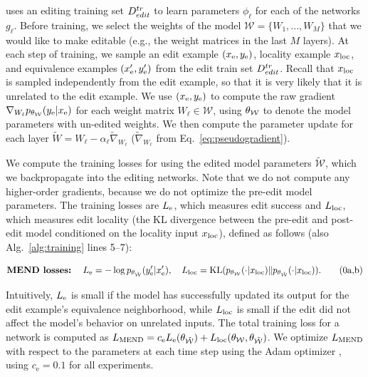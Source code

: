 \documentclass{article}
\begin{document}
{\name} uses an editing training set $D^{tr}_{edit}$ to learn parameters $\phi_\ell$ for each of the {\name} networks $g_\ell$. Before training, we select the weights of the model $\mathcal{W}=\{W_1,...,W_M\}$ that we would like to make editable (e.g., the weight matrices in the last $M$ layers). At each step of training, we sample an edit example $(x_\text{e},y_\text{e})$, locality example $x_\text{loc}$, and equivalence examples $(x_\text{e}',y_\text{e}')$ from the edit train set $D^{tr}_{edit}$. Recall that $x_\text{loc}$ is sampled independently from the edit example, so that it is very likely that it is unrelated to the edit example. We use $(x_\text{e},y_\text{e})$ to compute the raw gradient $\nabla_{W_\ell}p_{\theta_\mathcal{W}}(y_\text{e}|x_\text{e})$ for each weight matrix $W_\ell\in\mathcal{W}$, using $\theta_\mathcal{W}$ to denote the model parameters with un-edited weights. We then compute the parameter update for each layer $\tilde W = W_\ell - \alpha_\ell\tilde{\nabla}_{W_\ell}$ ($\tilde{\nabla}_{W_\ell}$ from Eq.~\ref{eq:pseudogradient}).

We compute the training losses for {\name} using the edited model parameters $\mathcal{\tilde W}$, which we backpropagate into the editing networks. Note that we do not compute any higher-order gradients, because we do not optimize the pre-edit model parameters. The training losses are $L_\text{e}$, which measures edit success and $L_\text{loc}$, which measures edit locality (the KL divergence between the pre-edit and post-edit model conditioned on the locality input $x_\text{loc}$), defined as follows (also Alg.~\ref{alg:training} lines 5--7):
\vspace{-4mm}
\begin{tcolorbox}[top=-10pt,bottom=-2pt]
\begin{subequations}
    \label{eq:losses}
    \begin{gather}
        \textbf{{MEND} losses:}\quad\; L_\text{e} = -\log p_{\theta_\mathcal{\tilde W}}(y_\text{e}'|x_\text{e}'),\quad L_\text{loc} = \text{KL}(p_{\theta_\mathcal{W}}(\cdot|x_\text{loc}) \| p_{\theta_\mathcal{\tilde W}}(\cdot|x_\text{loc})). \tag{\theequation a,b}
    \end{gather}
\end{subequations}
\end{tcolorbox}
\vspace{-1mm}
Intuitively, $L_\text{e}$ is small if the model has successfully updated its output for the edit example's equivalence neighborhood, while $L_\text{loc}$ is small if the edit did not affect the model's behavior on unrelated inputs.  The total training loss for a {\name} network is computed as $L_\text{MEND} = c_\text{e} L_\text{e}(\theta_\mathcal{\tilde W}) + L_\text{loc}(\theta_\mathcal{W},\theta_\mathcal{\tilde W})$. We optimize $L_\text{MEND}$ with respect to the {\name} parameters at each time step using the Adam optimizer \citep{kingma2015adam}, using $c_\text{e}=0.1$ for all experiments.
\end{document}
